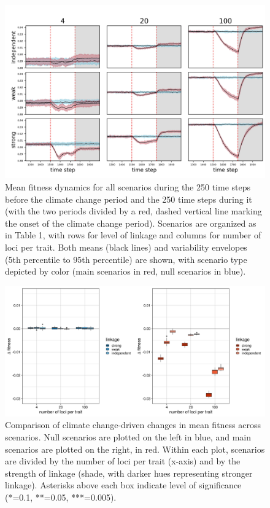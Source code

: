 \documentclass[9pt,twocolumn,twoside,lineno]{pnas-new}
\begin{document}
\begin{figure}
\centering
\includegraphics[width=11.4cm]{fit_over_time.jpg}
\caption{Mean fitness dynamics for all scenarios during the 250 time steps before the climate change period and the 250 time steps during it (with the two periods divided by a red, dashed vertical line marking the onset of the climate change period). Scenarios are organized as in Table 1, with rows for level of linkage and columns for number of loci per trait. Both means (black lines) and variability envelopes (5th percentile to 95th percentile) are shown, with scenario type depicted by color (main scenarios in red, null scenarios in blue).}
\label{fig:fit_over_time}
\end{figure}

\begin{figure}
\centering
\includegraphics[width=11.4cm]{fit_boxplot.jpg}
\caption{Comparison of climate change-driven changes in mean fitness across scenarios. Null scenarios are plotted on the left in blue, and main scenarios are plotted on the right, in red. Within each plot, scenarios are divided by the number of loci per trait (x-axis) and by the strength of linkage (shade, with darker hues representing stronger linkage). Asterisks above each box indicate level of significance (*=0.1, **=0.05, ***=0.005).}
\label{fig:fit_boxplot}
\end{figure}
\end{document}
